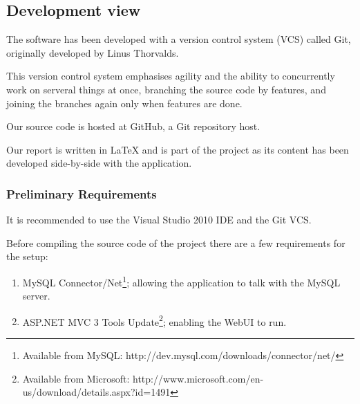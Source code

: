 \subsection{Development view}

The software has been developed with a version control system (VCS) called Git\cite{progit},
originally developed by Linus Thorvalds.

This version control system emphasises agility and the ability to concurrently work on serveral
things at once, branching the source code by features, and joining the branches again only when
features are done\cite{sopBranching}.

Our source code is hosted at GitHub, a Git repository host.

Our report is written in \LaTeX\cite{latexBook} and is part of the project as its content has been developed
side-by-side with the application.

\subsubsection{Preliminary Requirements}

It is recommended to use the Visual Studio 2010 IDE and the Git VCS.

Before compiling the source code of the project there are a few requirements for the setup:

\begin{enumerate}
    \item MySQL Connector/Net\footnote{Available from MySQL: http://dev.mysql.com/downloads/connector/net/};
        allowing the application to talk with the MySQL server.
    \item ASP.NET MVC 3 Tools Update\footnote{Available from Microsoft: http://www.microsoft.com/en-us/download/details.aspx?id=1491};
        enabling the WebUI to run.
\end{enumerate}